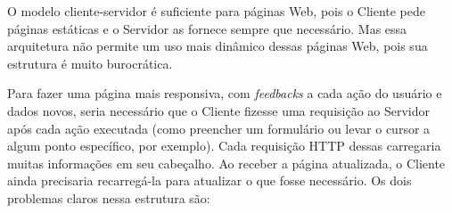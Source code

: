 \documentclass[a4paper,12pt]{article}
\begin{document}




O modelo cliente-servidor é suficiente para páginas Web, pois o Cliente pede páginas estáticas e o Servidor as fornece sempre que necessário. Mas essa arquitetura não permite um uso mais dinâmico dessas páginas Web, pois sua estrutura é muito burocrática.

Para fazer uma página mais responsiva, com \emph{feedbacks} a cada ação do usuário e dados novos, seria necessário que o Cliente fizesse uma requisição ao Servidor após cada ação executada (como preencher um formulário ou levar o cursor a algum ponto específico, por exemplo). Cada requisição HTTP dessas carregaria muitas informações em seu cabeçalho. Ao receber a página atualizada, o Cliente ainda precisaria recarregá-la para atualizar o que fosse necessário. Os dois problemas claros nessa estrutura são:
\end{document}
